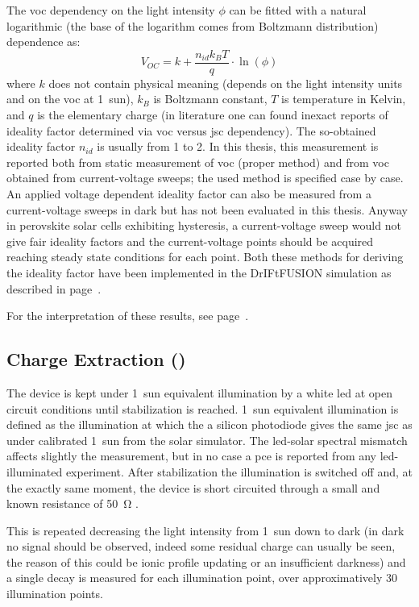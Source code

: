 		\label{methods_voc_intensity} The \gls{voc} dependency on the light intensity $\phi$ can be fitted with a natural logarithmic (the base of the logarithm comes from Boltzmann distribution) dependence as:
		$$V_{OC} = k + \frac{n_{id} k_B T}{q}\cdot\ln(\phi)$$
		where $k$ does not contain physical meaning (depends on the light intensity units and on the \gls{voc} at 1~sun), $k_B$ is Boltzmann constant, $T$ is temperature in Kelvin, and $q$ is the elementary charge\cite{Calado2018b} (in literature one can found inexact reports of ideality factor determined via \gls{voc} versus \gls{jsc} dependency). The so-obtained ideality factor $n_{id}$ is usually from 1 to 2. In this thesis, this measurement is reported both from static measurement of \gls{voc} (proper method) and from \gls{voc} obtained from current-voltage sweeps; the used method is specified case by case.	An applied voltage dependent ideality factor can also be measured from a current-voltage sweeps in dark but has not been evaluated in this thesis. Anyway in perovskite solar cells exhibiting hysteresis, a current-voltage sweep would not give fair ideality factors and the current-voltage points should be acquired reaching steady state conditions for each point. Both these methods for deriving the ideality factor have been implemented in the DrIFtFUSION simulation as described in page~\pageref{dd_ideality}.
		
		For the interpretation of these results, see page~\pageref{interpretation_lightintensity}.
		
	\subsection{Charge Extraction ()}

		The device is kept under 1~sun equivalent illumination by a white \gls{led} at open circuit conditions until stabilization is reached. 1~sun equivalent illumination is defined as the illumination at which the a silicon photodiode gives the same \gls{jsc} as under calibrated 1~sun from the solar simulator. The \gls{led}-solar spectral mismatch affects slightly the measurement, but in no case a \gls{pce} is reported from any \gls{led}-illuminated experiment. After stabilization the illumination is switched off and, at the exactly same moment, the device is short circuited through a small and known resistance of \SI{50}{\ohm} \cite{Duffy2000}.

		This is repeated decreasing the light intensity from 1~sun down to dark (in dark no signal should be observed, indeed some residual charge can usually be seen, the reason of this could be ionic profile updating or an insufficient darkness) and a single decay is measured for each illumination point, over approximatively 30 illumination points.

